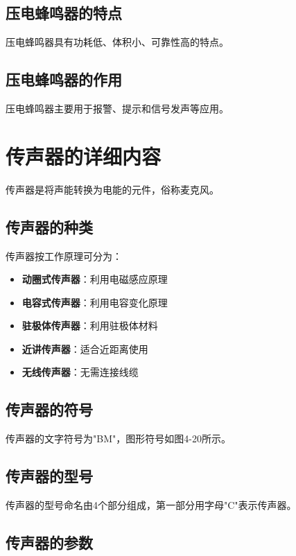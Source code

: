 \documentclass[12pt,UTF8]{ctexbook}
\begin{document}
\subsection{压电蜂鸣器的特点}

压电蜂鸣器具有功耗低、体积小、可靠性高的特点。

\subsection{压电蜂鸣器的作用}

压电蜂鸣器主要用于报警、提示和信号发声等应用。

\section{传声器的详细内容}

传声器是将声能转换为电能的元件，俗称麦克风。

\subsection{传声器的种类}

传声器按工作原理可分为：

\begin{itemize}[leftmargin=2cm]
	\item \textbf{动圈式传声器}：利用电磁感应原理
	\item \textbf{电容式传声器}：利用电容变化原理
	\item \textbf{驻极体传声器}：利用驻极体材料
	\item \textbf{近讲传声器}：适合近距离使用
	\item \textbf{无线传声器}：无需连接线缆
\end{itemize}

\subsection{传声器的符号}

传声器的文字符号为"BM"，图形符号如图4-20所示。

\subsection{传声器的型号}

传声器的型号命名由4个部分组成，第一部分用字母"C"表示传声器。

\subsection{传声器的参数}
\end{document}
